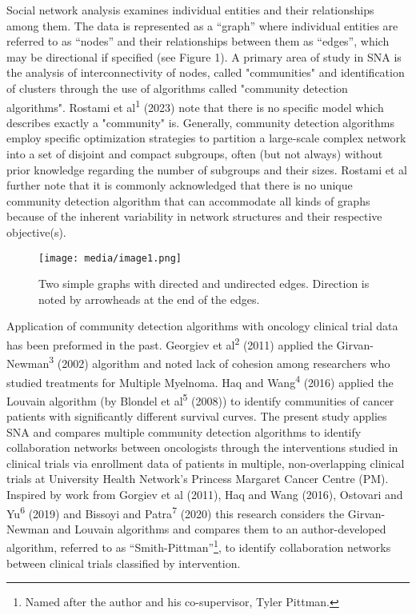 \documentclass{article}
\begin{document}
Social network analysis examines individual entities and their
relationships among them. The data is represented as a ``graph'' where
individual entities are referred to as ``nodes'' and their relationships
between them as ``edges'', which may be directional if specified (see
Figure 1). A primary area of study in SNA is the analysis of
interconnectivity of nodes, called "communities" and identification of
clusters through the use of algorithms called "community detection
algorithms". Rostami et al\textsuperscript{1} (2023) note that there is
no specific model which describes exactly a "community" is. Generally,
community detection algorithms employ specific optimization strategies
to partition a large-scale complex network into a set of disjoint and
compact subgroups, often (but not always) without prior knowledge
regarding the number of subgroups and their sizes. Rostami et al further
note that it is commonly acknowledged that there is no unique community
detection algorithm that can accommodate all kinds of graphs because of
the inherent variability in network structures and their respective
objective(s).

\begin{figure}
\centering
\texttt{[image: media/image1.png]}
\caption{Two simple graphs with directed and
undirected edges. Direction is noted by arrowheads at the end of the
edges.}
\end{figure}

Application of community detection algorithms with oncology clinical
trial data has been preformed in the past. Georgiev et
al\textsuperscript{2} (2011) applied the
Girvan-Newman\textsuperscript{3} (2002) algorithm and noted lack of
cohesion among researchers who studied treatments for Multiple Myelnoma.
Haq and Wang\textsuperscript{4} (2016) applied the Louvain algorithm (by
Blondel et al\textsuperscript{5} (2008)) to identify communities of
cancer patients with significantly different survival curves. The
present study applies SNA and compares multiple community detection
algorithms to identify collaboration networks between oncologists
through the interventions studied in clinical trials via enrollment data
of patients in multiple, non-overlapping clinical trials at University
Health Network's Princess Margaret Cancer Centre (PM). Inspired by work
from Gorgiev et al (2011), Haq and Wang (2016), Ostovari and
Yu\textsuperscript{6} (2019) and Bissoyi and Patra\textsuperscript{7}
(2020) this research considers the Girvan-Newman and Louvain algorithms
and compares them to an author-developed algorithm, referred to as
``Smith-Pittman''\footnote{Named after the author and his co-supervisor,
  Tyler Pittman.}, to identify collaboration networks between clinical
trials classified by intervention.
\end{document}
